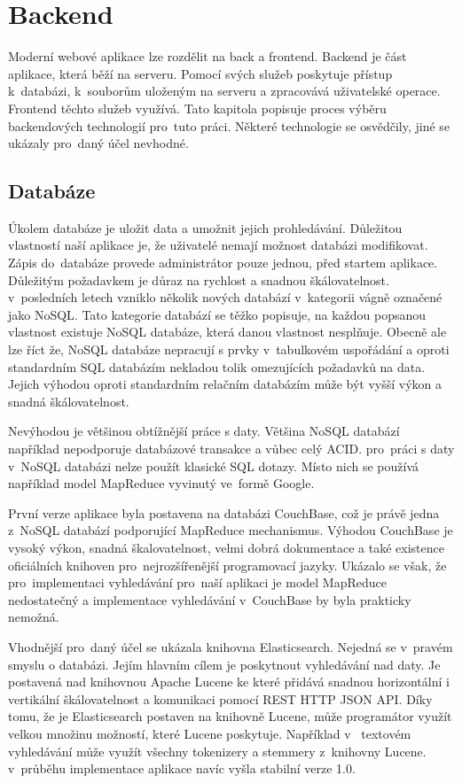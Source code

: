 \chapter{Backend}
\label{chap:backend}

Moderní webové aplikace lze rozdělit na back a frontend. Backend je část aplikace, která běží na serveru. Pomocí svých služeb poskytuje přístup k~databázi, k~souborům uloženým na serveru a zpracovává uživatelské operace. Frontend těchto služeb využívá. Tato kapitola popisuje proces výběru backendových technologií pro~tuto práci. Některé technologie se osvědčily, jiné se ukázaly pro~daný účel nevhodné.

\section{Databáze}

Úkolem databáze je uložit data a umožnit jejich prohledávání. Důležitou vlastností naší aplikace je, že uživatelé nemají možnost databázi modifikovat. Zápis do~databáze provede administrátor pouze jednou, před startem aplikace. Důležitým požadavkem je důraz na rychlost a snadnou škálovatelnost. v~posledních letech vzniklo několik nových databází v~kategorii vágně označené jako NoSQL\cite{nosql}. Tato kategorie databází se těžko popisuje, na každou popsanou vlastnost existuje NoSQL databáze, která danou vlastnost nesplňuje. Obecně ale lze říct že, NoSQL databáze nepracují s prvky v~tabulkovém uspořádání a oproti standardním SQL databázím nekladou tolik omezujících požadavků na data. Jejich výhodou oproti standardním relačním databázím může být vyšší výkon a snadná škálovatelnost.

Nevýhodou je většinou obtížnější práce s daty. Většina NoSQL databází například nepodporuje databázové transakce a vůbec celý ACID. pro~práci s daty v~NoSQL databázi nelze použít klasické SQL dotazy. Místo nich se používá například model MapReduce\cite{mapreduce} vyvinutý ve~formě Google.

První verze aplikace byla postavena na databázi CouchBase\cite{couchbase}, což je právě jedna z~NoSQL databází podporující MapReduce mechanismus. Výhodou CouchBase je vysoký výkon, snadná škalovatelnost, velmi dobrá dokumentace a také existence oficiálních knihoven pro~nejrozšířenější programovací jazyky. Ukázalo se však, že pro~implementaci vyhledávání pro~naší aplikaci je model MapReduce nedostatečný a implementace vyhledávání v~CouchBase by byla prakticky nemožná.

Vhodnější pro~daný účel se ukázala knihovna Elasticsearch\cite{elasticsearch}. Nejedná se v~pravém smyslu o databázi. Jejím hlavním cílem je poskytnout vyhledávání nad daty. Je postavená nad knihovnou Apache Lucene ke které přidává snadnou horizontální i vertikální škálovatelnost a komunikaci pomocí REST HTTP JSON API. Díky tomu, že je Elasticsearch postaven na knihovně Lucene\cite{lucene}, může programátor využít velkou množinu možností, které Lucene poskytuje. Například v~ textovém vyhledávání může využít všechny tokenizery a stemmery z~knihovny Lucene. v~průběhu implementace aplikace navíc vyšla stabilní verze 1.0.

